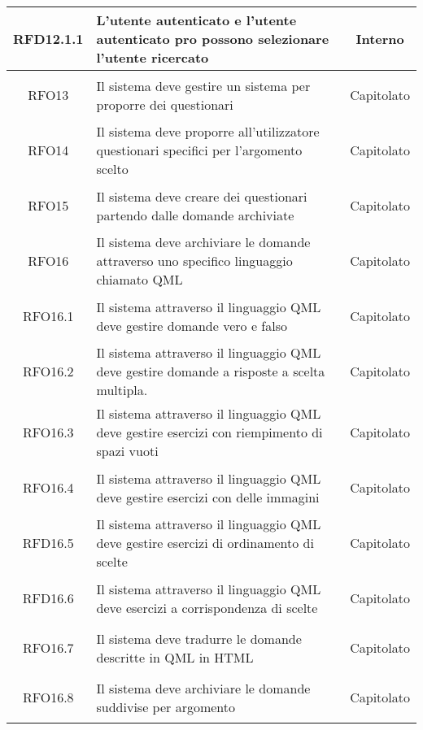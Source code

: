 \begin{longtable}{|c|>{\centering}m{7cm}|c|}
\hypertarget{RFD12.1.1}{RFD12.1.1} &  L’utente autenticato e l’utente autenticato pro possono selezionare l’utente ricercato & Interno
\\ \hline

\hypertarget{RFO13}{RFO13} & Il sistema deve gestire un sistema per proporre dei questionari & Capitolato
\\ \hline

\hypertarget{RFO14}{RFO14} & Il sistema deve proporre all’utilizzatore questionari specifici per l’argomento scelto & Capitolato
\\ \hline

\hypertarget{RFO15}{RFO15} & Il sistema deve creare dei questionari partendo dalle domande archiviate & Capitolato
\\ \hline

\hypertarget{RFO16}{RFO16} & Il sistema deve archiviare le domande attraverso uno specifico linguaggio chiamato QML & Capitolato
\\ \hline

\hypertarget{RFO16.1}{RFO16.1} & Il sistema attraverso il linguaggio QML deve gestire domande vero e falso & Capitolato
\\ \hline

\hypertarget{RFO16.2}{RFO16.2} & Il sistema attraverso il linguaggio QML deve gestire domande a risposte a scelta multipla. & Capitolato
\\ \hline

\hypertarget{RFO16.3}{RFO16.3} & Il sistema attraverso il linguaggio QML deve gestire esercizi con riempimento di spazi vuoti & Capitolato
\\ \hline

\hypertarget{RFO16.4}{RFO16.4} & Il sistema attraverso il linguaggio QML deve gestire esercizi con delle immagini & Capitolato
\\ \hline

\hypertarget{RFD16.5}{RFD16.5} & Il sistema attraverso il linguaggio QML deve gestire esercizi di ordinamento di scelte & Capitolato
\\ \hline

\hypertarget{RFD16.6}{RFD16.6} & Il sistema attraverso il linguaggio QML deve esercizi a corrispondenza di scelte & Capitolato
\\ \hline

\hypertarget{RFO16.7}{RFO16.7} & Il sistema deve tradurre le domande descritte in QML in HTML & Capitolato
\\ \hline

\hypertarget{RFO16.8}{RFO16.8} & Il sistema deve archiviare le domande suddivise per argomento & Capitolato
\\ \hline


\end{longtable}
